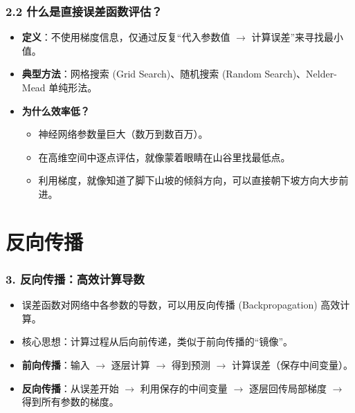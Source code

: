 \documentclass[t,aspectratio=169]{beamer} %
\begin{document}
\begin{frame}
    \frametitle{2.2 什么是直接误差函数评估？}
    \begin{itemize}
        \item \textbf{定义}：不使用梯度信息，仅通过反复“代入参数值 $\rightarrow$ 计算误差”来寻找最小值。
        \item \textbf{典型方法}：网格搜索 (Grid Search)、随机搜索 (Random Search)、Nelder-Mead 单纯形法。
        \item \textbf{为什么效率低？}
        \begin{itemize}
            \item 神经网络参数量巨大（数万到数百万）。
            \item 在高维空间中逐点评估，就像\alert{蒙着眼睛在山谷里找最低点}。
            \item 利用梯度，就像\alert{知道了脚下山坡的倾斜方向}，可以直接朝下坡方向大步前进。
        \end{itemize}
    \end{itemize}
\end{frame}

\section{反向传播}

\begin{frame}
    \frametitle{3. 反向传播：高效计算导数}
    \begin{itemize}
        \item 误差函数对网络中各参数的导数，可以用\alert{反向传播 (Backpropagation)} 高效计算。
        \item 核心思想：计算过程从后向前传递，类似于前向传播的“镜像”。
        \item \textbf{前向传播}：输入 $\rightarrow$ 逐层计算 $\rightarrow$ 得到预测 $\rightarrow$ 计算误差（保存中间变量）。
        \item \textbf{反向传播}：从误差开始 $\rightarrow$ 利用保存的中间变量 $\rightarrow$ 逐层回传局部梯度 $\rightarrow$ 得到所有参数的梯度。
    \end{itemize}
\end{frame}
\end{document}
